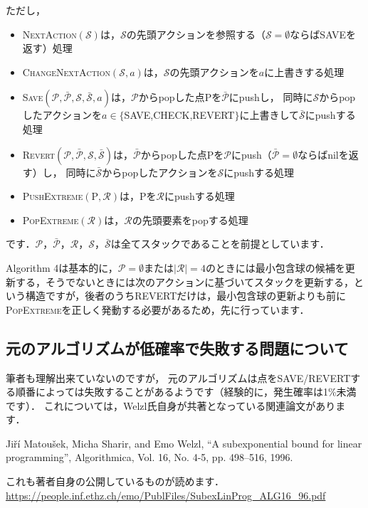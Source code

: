 ﻿\documentclass[a4paper]{jsarticle}
\begin{document}
ただし，
\begin{itemize}
\item \textsc{NextAction}$(\mathcal{S})$は，$\mathcal{S}$の先頭アクションを参照する（$\mathcal{S}=\emptyset$ならばSAVEを返す）処理
\item \textsc{ChangeNextAction}$(\mathcal{S},a)$は，$\mathcal{S}$の先頭アクションを$a$に上書きする処理
\item \textsc{Save}$(\mathcal{P},\bar{\mathcal{P}},\mathcal{S},\bar{\mathcal{S}},a)$は，$\mathcal{P}$からpopした点$\mathrm{P}$を$\bar{\mathcal{P}}$にpushし，
同時に$\mathcal{S}$からpopしたアクションを$a\in\{$SAVE,CHECK,REVERT$\}$に上書きして$\bar{\mathcal{S}}$にpushする処理
\item \textsc{Revert}$(\mathcal{P},\bar{\mathcal{P}},\mathcal{S},\bar{\mathcal{S}})$は，$\bar{\mathcal{P}}$からpopした点$\mathrm{P}$を$\mathcal{P}$にpush（$\bar{\mathcal{P}}=\emptyset$ならばnilを返す）し，
同時に$\bar{\mathcal{S}}$からpopしたアクションを$\mathcal{S}$にpushする処理
\item \textsc{PushExtreme}$(\mathrm{P},\mathcal{R})$は，$\mathrm{P}$を$\mathcal{R}$にpushする処理
\item \textsc{PopExtreme}$(\mathcal{R})$は，$\mathcal{R}$の先頭要素をpopする処理
\end{itemize}
です．$\mathcal{P}$，$\bar{\mathcal{P}}$，$\mathcal{R}$，$\mathcal{S}$，$\bar{\mathcal{S}}$は全てスタックであることを前提としています．

Algorithm 4は基本的に，$\mathcal{P}=\emptyset$または$|\mathcal{R}|=4$のときには最小包含球の候補を更新する，そうでないときには次のアクションに基づいてスタックを更新する，という構造ですが，後者のうちREVERTだけは，最小包含球の更新よりも前に\textsc{PopExtreme}を正しく発動する必要があるため，先に行っています．

\subsection{元のアルゴリズムが低確率で失敗する問題について}

筆者も理解出来ていないのですが，
元のアルゴリズムは点をSAVE/REVERTする順番によっては失敗することがあるようです（経験的に，発生確率は1{\%}未満です）．
これについては，Welzl氏自身が共著となっている関連論文があります．

Ji{\v{r}}{\'{i}} Matou{\v{s}}ek, Micha Sharir, and Emo Welzl, ``A subexponential bound for linear programming'', Algorithmica, Vol. 16, No. 4-5, pp. 498--516, 1996.

これも著者自身の公開しているものが読めます．
\url{https://people.inf.ethz.ch/emo/PublFiles/SubexLinProg_ALG16_96.pdf}
\end{document}
